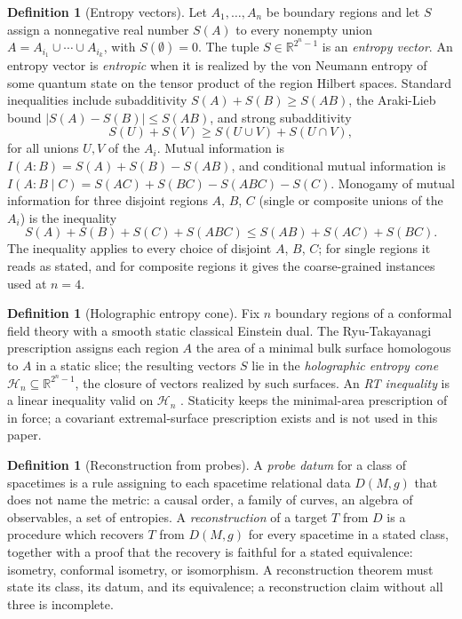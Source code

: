 \documentclass[11pt,letterpaper]{article}
\theoremstyle{definition}
\newtheorem{definition}[theorem]{Definition}
\theoremstyle{remark}
\begin{document}
\begin{definition}[Entropy vectors]\label{def:entropy}
Let $A_1, \dots, A_n$ be boundary regions and let $S$ assign a nonnegative real number $S(A)$ to every nonempty union $A = A_{i_1} \cup \cdots \cup A_{i_k}$, with $S(\emptyset) = 0$. The tuple $S \in \mathbb{R}^{2^n - 1}$ is an \emph{entropy vector}. An entropy vector is \emph{entropic} when it is realized by the von Neumann entropy of some quantum state on the tensor product of the region Hilbert spaces. Standard inequalities include subadditivity $S(A) + S(B) \ge S(AB)$, the Araki-Lieb bound $|S(A) - S(B)| \le S(AB)$, and strong subadditivity
\begin{equation}\label{eq:ssa}
S(U) + S(V) \ge S(U \cup V) + S(U \cap V),
\end{equation}
for all unions $U, V$ of the $A_i$. Mutual information is $I(A{:}B) = S(A) + S(B) - S(AB)$, and conditional mutual information is $I(A{:}B \mid C) = S(AC) + S(BC) - S(ABC) - S(C)$. Monogamy of mutual information for three disjoint regions $A$, $B$, $C$ (single or composite unions of the $A_i$) is the inequality
\begin{equation}\label{eq:mmi}
S(A) + S(B) + S(C) + S(ABC) \le S(AB) + S(AC) + S(BC).
\end{equation}
The inequality applies to every choice of disjoint $A$, $B$, $C$; for single regions it reads as stated, and for composite regions it gives the coarse-grained instances used at $n = 4$.
\end{definition}

\begin{definition}[Holographic entropy cone]\label{def:cone}
Fix $n$ boundary regions of a conformal field theory with a smooth static classical Einstein dual. The Ryu-Takayanagi prescription assigns each region $A$ the area of a minimal bulk surface homologous to $A$ in a static slice; the resulting vectors $S$ lie in the \emph{holographic entropy cone} $\mathcal{H}_n \subseteq \mathbb{R}^{2^n-1}$, the closure of vectors realized by such surfaces. An \emph{RT inequality} is a linear inequality valid on $\mathcal{H}_n$ \cite{baoetal}. Staticity keeps the minimal-area prescription of \cite{ryutakayanagi} in force; a covariant extremal-surface prescription exists \cite{hrt} and is not used in this paper.
\end{definition}

\begin{definition}[Reconstruction from probes]\label{def:reconstruction}
A \emph{probe datum} for a class of spacetimes is a rule assigning to each spacetime relational data $D(M,g)$ that does not name the metric: a causal order, a family of curves, an algebra of observables, a set of entropies. A \emph{reconstruction} of a target $T$ from $D$ is a procedure which recovers $T$ from $D(M,g)$ for every spacetime in a stated class, together with a proof that the recovery is faithful for a stated equivalence: isometry, conformal isometry, or isomorphism. A reconstruction theorem must state its class, its datum, and its equivalence; a reconstruction claim without all three is incomplete.
\end{definition}
\end{document}
